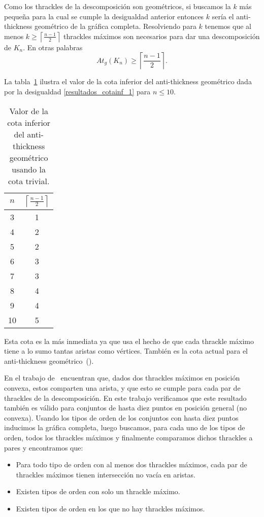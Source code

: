 Como los thrackles de la descomposición son geométricos, si buscamos la $k$ más
pequeña para la cual se cumple la desigualdad anterior entonces $k$
sería el anti-thickness geométrico de la gráfica completa.
Resolviendo para $k$  tenemos que al menos
$k\geq\left\lceil\frac{n-1}{2}\right\rceil$ thrackles máximos son necesarios
para dar una descomposición de $K_n$. En otras palabras
\begin{equation}
  At_g(K_n) \geq  \left\lceil\frac{n-1}{2}\right\rceil.
  \label{resultados_cotainf_1}
\end{equation}

La tabla~\ref{table:attrivialinf} ilustra el valor de la cota inferior del
anti-thickness geométrico dada por la desigualdad \ref{resultados_cotainf_1}
para $n\leq 10$.
\begin{table}[t]
  \centering
  \begin{tabular}{|c|c|}
    \hline
    $n$ & $\left\lceil\frac{n-1}{2}\right\rceil$ \\[5pt] \hline\hline
    3   & 1  \\
    4   & 2  \\
    5   & 2  \\
    6   & 3  \\
    7   & 3  \\
    8   & 4  \\
    9   & 4  \\
    10  & 5  \\ \hline
  \end{tabular}
  \caption{ Valor de la cota inferior del anti-thickness geométrico usando la cota trivial. }
  \label{table:attrivialinf}
\end{table}
Esta cota es la más inmediata ya que usa el hecho de que cada thrackle máximo tiene a lo sumo tantas aristas como vértices. También es la cota actual para el anti-thickness geométrico~(\cite{Dujmovic2017}).

En el trabajo de~\cite{Fabila-Monroy2018} encuentran que, dados dos thrackles
máximos en posición convexa, estos comparten una arista, y que esto se cumple
para cada par de thrackles de la descomposición. En este trabajo verificamos
que este resultado también es válido para conjuntos de hasta diez puntos en
posición general (no convexa). Usando los tipos de orden de los conjuntos
con hasta diez puntos inducimos la gráfica completa, luego buscamos, para
cada uno de los tipos de orden, todos los thrackles máximos y
finalmente comparamos dichos thrackles a pares y encontramos que:
\begin{itemize}
  \item Para todo tipo de orden con al menos dos thrackles máximos, cada par de thrackles máximos tienen intersección no vacía en aristas.
  \item Existen tipos de orden con solo un thrackle máximo.
  \item Existen tipos de orden en los que no hay thrackles máximos.
\end{itemize}

